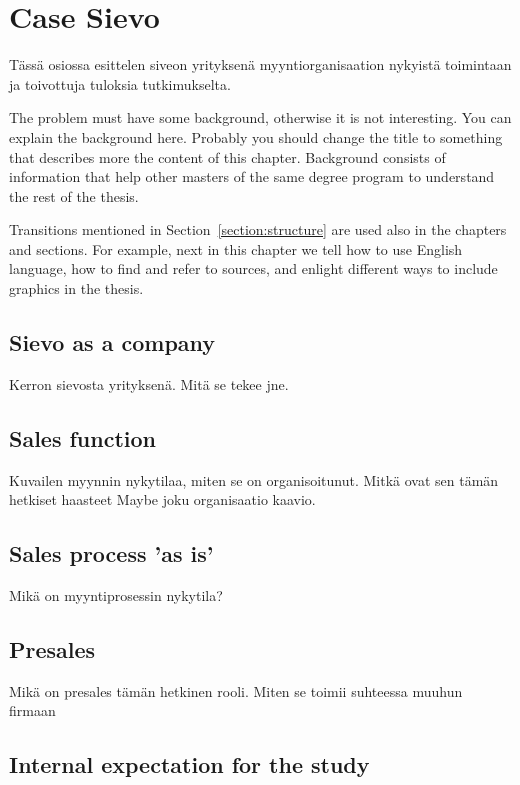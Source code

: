 \documentclass[12pt,a4paper,oneside,pdftex]{report}
\begin{document}
% 

\chapter{Case Sievo}
\label{chapter:Case Sievo}

Tässä osiossa esittelen siveon yrityksenä myyntiorganisaation nykyistä toimintaan ja toivottuja tuloksia tutkimukselta.

The problem must have some background, otherwise it is not
interesting.  You can explain the background here. Probably you should
change the title to something that describes more the content of this
chapter. Background consists of information that help other masters of
the same degree program to understand the rest of the thesis.

Transitions mentioned in Section~\ref{section:structure} are used also
in the chapters and sections. For example, next in this chapter we
tell how to use English language, how to find and refer to sources,
and enlight different ways to include graphics in the thesis.

\section{Sievo as a company}

Kerron sievosta yrityksenä. Mitä se tekee jne. 


\section{Sales function}

Kuvailen myynnin nykytilaa, miten se on organisoitunut. Mitkä ovat sen tämän hetkiset haasteet
Maybe joku organisaatio kaavio. 


\section{Sales process 'as is'}

Mikä on myyntiprosessin nykytila?

\section{Presales}

Mikä on presales tämän hetkinen rooli. Miten se toimii suhteessa muuhun firmaan

\section{Internal expectation for the study}
\end{document}
